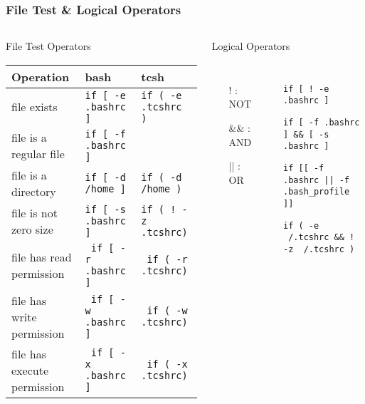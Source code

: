 \documentclass[slidestop,mathserif,compress,xcolor=svgnames]{beamer}
\newenvironment{eblock}[0]
{
\begin{beamerboxesrounded}[upper=uppercol2,lower=lowercol2,shadow=true]}
{\end{beamerboxesrounded}}
\begin{document}
\begin{frame}
  \frametitle{\small File Test \& Logical Operators}
  \begin{columns}
    \begin{eblock}{File Test Operators}
      \begin{tabular}{lll}
        Operation & \textbf{bash} & \textbf{tcsh} \\
        \hline
        file exists & \texttt{if [ -e .bashrc ]} & \texttt{if ( -e .tcshrc )}\\
        file is a regular file & \texttt{if [ -f .bashrc ]} &  \\
        file is a directory & \texttt{if [ -d /home ]} & \texttt{if ( -d /home )} \\
        file is not zero size & \texttt{if [ -s .bashrc ]} & \texttt{if ( ! -z .tcshrc)} \\
        file has read permission & \texttt{ if [ -r .bashrc ]} & \texttt{ if ( -r .tcshrc)} \\
        file has write permission & \texttt{ if [ -w .bashrc ]} & \texttt{ if ( -w .tcshrc)} \\
        file has execute permission & \texttt{ if [ -x .bashrc ]} & \texttt{ if ( -x .tcshrc)} \\
        \hline
      \end{tabular}
    \end{eblock}
    \begin{eblock}{Logical Operators}
      \vspace{-0.2cm}
      \begin{columns}
        \column{2cm}
        \begin{itemize}
          \item[!]: NOT
          \item[\&\&]: AND
          \item[||]: OR
        \end{itemize}
        \column{9cm}
        \begin{itemize}
          \item[] \texttt{if [ ! -e .bashrc ]}
          \item[] \texttt{if [ -f .bashrc ] \&\& [ -s .bashrc ]}
          \item[] \texttt{if [[ -f .bashrc || -f .bash\_profile ]] }
          \item[] \texttt{if ( -e ~/.tcshrc  \&\&  ! -z ~/.tcshrc )}
        \end{itemize}
      \end{columns}
    \end{eblock}
  \end{columns}
\end{frame}
\end{document}

